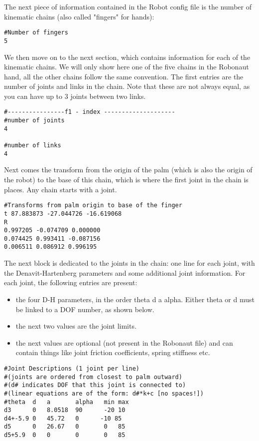 The next piece of information contained in the Robot config file is
the number of kinematic chains (also called "fingers" for hands):

\begin{verbatim}
#Number of fingers
5
\end{verbatim}

We then move on to the next section, which contains information for
 each of the kinematic chains. We will only show here one of the five
 chains in the Robonaut hand, all the other chains follow the same
 convention. The first entries are the number of joints and links in
 the chain. Note that these are not always equal, as you can have up
 to 3 joints between two links.

\begin{verbatim}
#----------------f1 - index --------------------
#number of joints
4

#number of links
4
\end{verbatim}

Next comes the transform from the origin of the palm (which is also
the origin of the robot) to the base of this chain, which is where the
first joint in the chain is places. Any chain starts with a joint.

\begin{verbatim}
#Transforms from palm origin to base of the finger
t 87.883873 -27.044726 -16.619068
R
0.997205 -0.074709 0.000000
0.074425 0.993411 -0.087156
0.006511 0.086912 0.996195
\end{verbatim}

The next block is dedicated to the joints in the chain: one line for
each joint, with the Denavit-Hartenberg parameters and some additional
joint information. For each joint, the following entries are present:
\begin{itemize}
\item the four D-H parameters, in the order theta d a alpha. Either
  theta or d must be linked to a DOF number, as shown below.
\item the next two values are the joint limits.
\item the next values are optional (not present in the Robonaut file)
  and can contain things like joint friction coefficients, spring
  stiffness etc.
\end{itemize}

\begin{verbatim}
#Joint Descriptions (1 joint per line)
#(joints are ordered from closest to palm outward)
#(d# indicates DOF that this joint is connected to)
#(linear equations are of the form: d#*k+c [no spaces!])
#theta	d	a	    alpha	min	max
d3     	0	8.0518	90 	    -20 10
d4+-5.9	0	45.72   0      -10 85
d5     	0	26.67   0       0 	85
d5+5.9 	0	0       0  	    0 	85
\end{verbatim}


